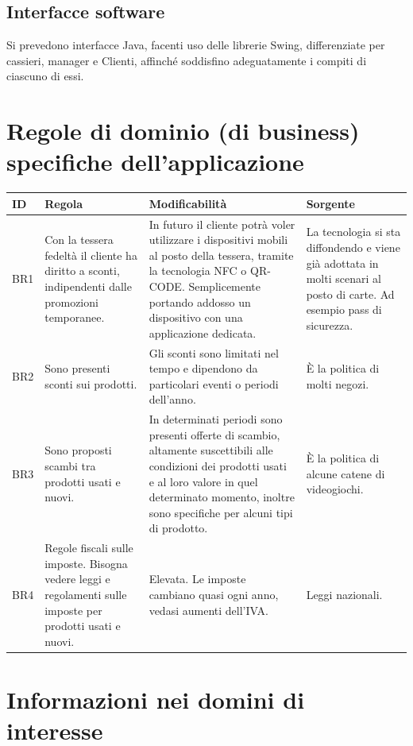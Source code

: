 \documentclass[a4paper,10pt]{report}
\begin{document}
 \subsection*{Interfacce software}
Si prevedono interfacce Java, facenti uso delle librerie Swing, differenziate per cassieri, manager e Clienti, affinché soddisfino adeguatamente i compiti di ciascuno di essi.
 
 \section*{Regole di dominio (di business) specifiche dell'applicazione}
 \begin{tabular}{|p{}|p{}|p{}|p{}|}
 \hline
  \textbf{ID} & \textbf{Regola} & \textbf{Modificabilità} & \textbf{Sorgente} \\
  \hline
  BR1 &
  Con la tessera fedeltà il cliente ha diritto a sconti, indipendenti dalle promozioni temporanee. &
  In futuro il cliente potrà voler utilizzare i dispositivi mobili al posto della tessera, tramite la tecnologia NFC o QR-CODE. Semplicemente portando addosso un dispositivo con una applicazione dedicata. &
  La tecnologia si sta diffondendo e viene già adottata in molti scenari al posto di carte. Ad esempio pass di sicurezza.\\
  \hline
  BR2 & 
  Sono presenti sconti sui prodotti. &
  Gli sconti sono limitati nel tempo e dipendono da particolari eventi o periodi dell'anno. &
  È la politica di molti negozi.\\
  \hline
  BR3 &
  Sono proposti scambi tra prodotti usati e nuovi. &
  In determinati periodi sono presenti offerte di scambio, altamente suscettibili alle condizioni dei prodotti usati e al loro valore in quel determinato momento, inoltre sono specifiche per alcuni tipi di prodotto. &
  È la politica di alcune catene di videogiochi. \\
  \hline
  BR4 &
  Regole fiscali sulle imposte. Bisogna vedere leggi e regolamenti sulle imposte per prodotti usati e nuovi. &
  Elevata. Le imposte cambiano quasi ogni anno, vedasi aumenti dell'IVA. &
  Leggi nazionali.\\
  \hline
 \end{tabular}

\section*{Informazioni nei domini di interesse}
\end{document}
